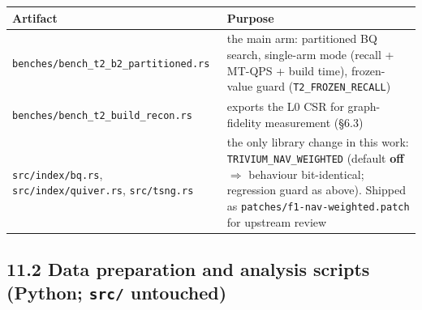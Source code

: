 \documentclass[
  10pt,
]{article}
\newcounter{none} %
\begin{document}
{\def\LTcaptype{none} %
\begin{longtable}[]{@{}
  >{\raggedright\arraybackslash}p{}
  >{\raggedright\arraybackslash}p{}@{}}
\toprule\noalign{}
\begin{minipage}[b]{\linewidth}\raggedright
Artifact
\end{minipage} & \begin{minipage}[b]{\linewidth}\raggedright
Purpose
\end{minipage} \\
\midrule\noalign{}
\endhead
\bottomrule\noalign{}
\endlastfoot
\texttt{benches/bench\_t2\_b2\_partitioned.rs} & the main arm:
partitioned BQ search, single-arm mode (recall + MT-QPS + build time),
frozen-value guard (\texttt{T2\_FROZEN\_RECALL}) \\
\texttt{benches/bench\_t2\_build\_recon.rs} & exports the L0 CSR for
graph-fidelity measurement (§6.3) \\
\texttt{src/index/bq.rs}, \texttt{src/index/quiver.rs},
\texttt{src/tsng.rs} & the only library change in this work:
\texttt{TRIVIUM\_NAV\_WEIGHTED} (default \textbf{off} $\Rightarrow$ behaviour
bit-identical; regression guard as above). Shipped as
\texttt{patches/f1-nav-weighted.patch} for upstream review \\
\end{longtable}
}

\subsection{\texorpdfstring{11.2 Data preparation and analysis scripts
(Python; \texttt{src/}
untouched)}{11.2 Data preparation and analysis scripts (Python; src/ untouched)}}\label{data-preparation-and-analysis-scripts-python-src-untouched}
\end{document}
